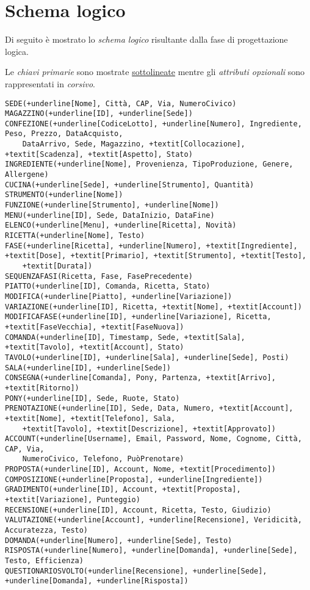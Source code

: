\section{Schema logico}
Di seguito è mostrato lo {\it schema logico} risultante dalla fase di progettazione logica.

Le {\it chiavi primarie} sono mostrate \underline{sottolineate} mentre gli {\it attributi opzionali}
sono rappresentati in \textit{corsivo}.

\begin{Verbatim}[commandchars=+\[\]]
SEDE(+underline[Nome], Città, CAP, Via, NumeroCivico)
MAGAZZINO(+underline[ID], +underline[Sede])
CONFEZIONE(+underline[CodiceLotto], +underline[Numero], Ingrediente, Peso, Prezzo, DataAcquisto,
    DataArrivo, Sede, Magazzino, +textit[Collocazione], +textit[Scadenza], +textit[Aspetto], Stato)
INGREDIENTE(+underline[Nome], Provenienza, TipoProduzione, Genere, Allergene)
CUCINA(+underline[Sede], +underline[Strumento], Quantità)
STRUMENTO(+underline[Nome])
FUNZIONE(+underline[Strumento], +underline[Nome])
MENU(+underline[ID], Sede, DataInizio, DataFine)
ELENCO(+underline[Menu], +underline[Ricetta], Novità)
RICETTA(+underline[Nome], Testo)
FASE(+underline[Ricetta], +underline[Numero], +textit[Ingrediente], +textit[Dose], +textit[Primario], +textit[Strumento], +textit[Testo],
    +textit[Durata])
SEQUENZAFASI(Ricetta, Fase, FasePrecedente)
PIATTO(+underline[ID], Comanda, Ricetta, Stato)
MODIFICA(+underline[Piatto], +underline[Variazione])
VARIAZIONE(+underline[ID], Ricetta, +textit[Nome], +textit[Account])
MODIFICAFASE(+underline[ID], +underline[Variazione], Ricetta, +textit[FaseVecchia], +textit[FaseNuova])
COMANDA(+underline[ID], Timestamp, Sede, +textit[Sala], +textit[Tavolo], +textit[Account], Stato)
TAVOLO(+underline[ID], +underline[Sala], +underline[Sede], Posti)
SALA(+underline[ID], +underline[Sede])
CONSEGNA(+underline[Comanda], Pony, Partenza, +textit[Arrivo], +textit[Ritorno])
PONY(+underline[ID], Sede, Ruote, Stato)
PRENOTAZIONE(+underline[ID], Sede, Data, Numero, +textit[Account], +textit[Nome], +textit[Telefono], Sala,
    +textit[Tavolo], +textit[Descrizione], +textit[Approvato])
ACCOUNT(+underline[Username], Email, Password, Nome, Cognome, Città, CAP, Via,
    NumeroCivico, Telefono, PuòPrenotare)
PROPOSTA(+underline[ID], Account, Nome, +textit[Procedimento])
COMPOSIZIONE(+underline[Proposta], +underline[Ingrediente])
GRADIMENTO(+underline[ID], Account, +textit[Proposta], +textit[Variazione], Punteggio)
RECENSIONE(+underline[ID], Account, Ricetta, Testo, Giudizio)
VALUTAZIONE(+underline[Account], +underline[Recensione], Veridicità, Accuratezza, Testo)
DOMANDA(+underline[Numero], +underline[Sede], Testo)
RISPOSTA(+underline[Numero], +underline[Domanda], +underline[Sede], Testo, Efficienza)
QUESTIONARIOSVOLTO(+underline[Recensione], +underline[Sede], +underline[Domanda], +underline[Risposta])
\end{Verbatim}
